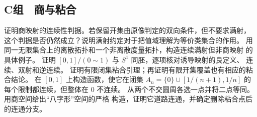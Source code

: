 \subsection*{C组　商与粘合}
\begin{enumerate}[label=\textbf{\thechapter.\arabic*.},resume]
 证明商映射的连续性判据。若保留开集由原像判定的双向条件，但不要求满射，
 这个判据是否仍然成立？说明满射约定对于把值域理解为等价类集合的作用。
 用同一无限集合上的离散拓扑和一个非离散度量拓扑，构造连续满射但非商映射
 的具体例子。
 证明 \([0,1]/(0\sim1)\) 与 \(S^1\) 同胚，逐项核对诱导映射的良定义、
 连续、双射和逆连续。
 证明有限闭集粘合引理；再证明有限开集覆盖也有相应的粘合结论。
 在 \([0,1]\) 上构造函数，使它在闭集
 \(A_n=\{0\}\cup[1/(n+1),1/n]\) 的每个限制都连续，但整体在 \(0\)
 不连续。
 从两个不交圆周各选一点并将二点等同。用商空间给出“八字形”空间的严格
 构造，证明它道路连通，并确定删除粘合点后的连通分支。
\end{enumerate}
